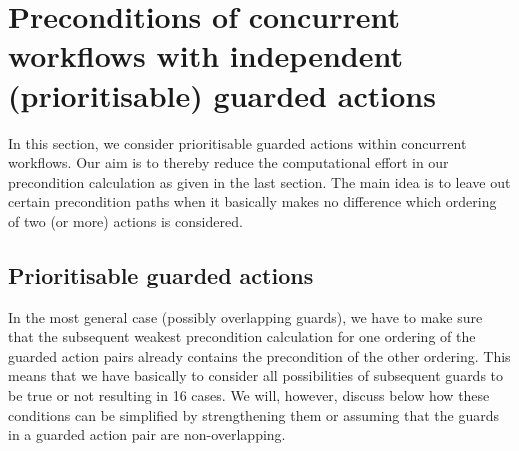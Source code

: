 \documentclass[11pt]{article}
\begin{document}
%
%

\section{Preconditions of concurrent workflows with independent (prioritisable) guarded actions}
\label{sec:combined_workflows}

In this section, we consider prioritisable guarded actions within concurrent workflows. Our aim is to thereby reduce the computational effort in our precondition calculation as given in the last section. The main idea is to leave out certain precondition paths when it basically makes no difference which ordering of two (or more) actions is considered. 

\subsection{Prioritisable guarded actions}

In the most general case (possibly overlapping guards), we have to make sure that the subsequent weakest precondition calculation for one ordering of the guarded action pairs already contains the precondition of the other ordering. This means that we have basically to consider all possibilities of subsequent guards to be true or not resulting in 16 cases. We will, however, discuss below how these conditions can be simplified by strengthening them or assuming that the guards in a guarded action pair are non-overlapping.
\end{document}
